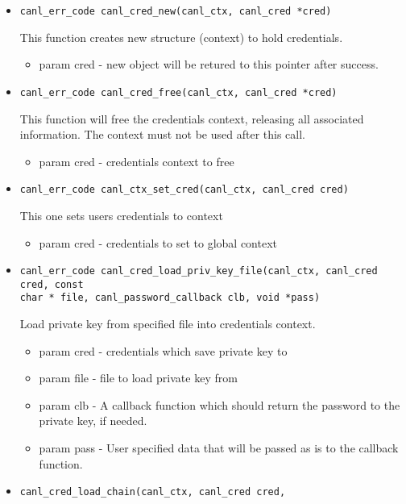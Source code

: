 \begin{itemize}
  \item \begin{verbatim}
canl_err_code canl_cred_new(canl_ctx, canl_cred *cred)\end{verbatim}
This function creates new structure (context) to hold credentials.
  \begin{itemize}
    \item param cred - new object will be retured to this pointer after
    success.
  \end{itemize}
  \item \begin{verbatim}
canl_err_code canl_cred_free(canl_ctx, canl_cred *cred)\end{verbatim}
  This function will free the credentials context, releasing
  all associated information.  The context must not be used after this call.
  \begin{itemize}
    \item param cred - credentials context to free 
  \end{itemize}
  \item \begin{verbatim}
canl_err_code canl_ctx_set_cred(canl_ctx, canl_cred cred)\end{verbatim}
  This one sets users credentials to \CANL context
  \begin{itemize}
    \item param cred - credentials to set to global \CANL context
  \end{itemize}
  \item \begin{verbatim}
canl_err_code canl_cred_load_priv_key_file(canl_ctx, canl_cred cred, const 
char * file, canl_password_callback clb, void *pass)\end{verbatim}
  Load private key from specified file into credentials context.
  \begin{itemize}
    \item param cred - credentials which save private key to
    \item param file - file to load private key from
    \item param clb - A callback function which should return
    the password to the private key, if needed.
    \item param pass - User specified data that will be passed
    as is to the callback function.
  \end{itemize}
  \item \verb'canl_cred_load_chain(canl_ctx, canl_cred cred,'

\end{itemize}
